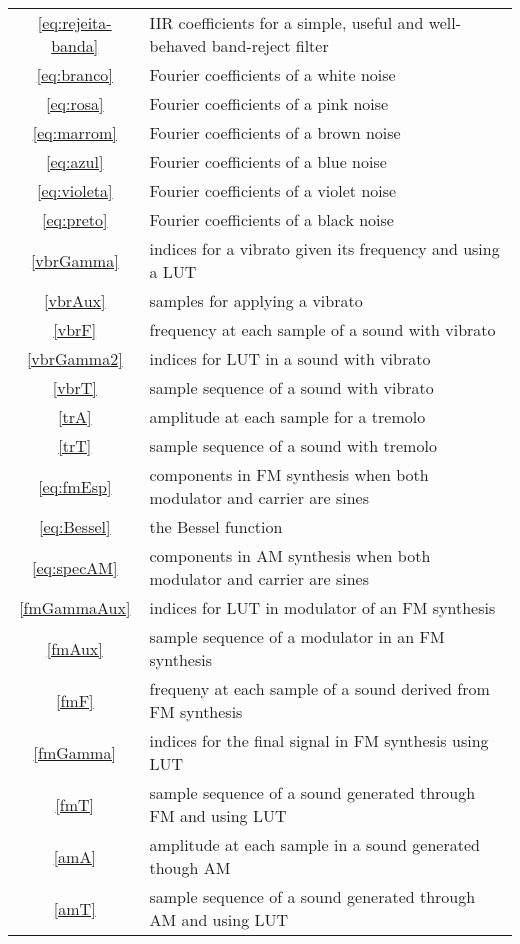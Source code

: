 \documentclass{scrreprt}
\begin{document}
\begin{table*}[htp!]
\begin{tabular}{ c | p{12cm} }
 \ref{eq:rejeita-banda} & IIR coefficients for a simple, useful and well-behaved band-reject filter \\
 \ref{eq:branco} & Fourier coefficients of a white noise \\
 \ref{eq:rosa} & Fourier coefficients of a pink noise \\
 \ref{eq:marrom} & Fourier coefficients of a brown noise \\
 \ref{eq:azul} & Fourier coefficients of a blue noise \\
 \ref{eq:violeta} & Fourier coefficients of a violet noise \\
 \ref{eq:preto} & Fourier coefficients of a black noise \\
 \ref{vbrGamma} & indices for a vibrato given its frequency and using a LUT \\
 \ref{vbrAux} & samples for applying a vibrato \\
 \ref{vbrF} & frequency at each sample of a sound with vibrato \\
 \ref{vbrGamma2} & indices for LUT in a sound with vibrato \\
 \ref{vbrT} & sample sequence of a sound with vibrato \\
 \ref{trA} & amplitude at each sample for a tremolo \\
 \ref{trT} & sample sequence of a sound with tremolo \\
 \ref{eq:fmEsp} & components in FM synthesis when both modulator and carrier are sines \\
 \ref{eq:Bessel} & the Bessel function \\
 \ref{eq:specAM} & components in AM synthesis when both modulator and carrier are sines \\
 \ref{fmGammaAux} & indices for LUT in modulator of an FM synthesis \\
 \ref{fmAux} & sample sequence of a modulator in an FM synthesis \\
 \ref{fmF} & frequeny at each sample of a sound derived from FM synthesis \\
 \ref{fmGamma} & indices for the final signal in FM synthesis using LUT \\
 \ref{fmT} & sample sequence of a sound generated through FM and using LUT \\
 \ref{amA} & amplitude at each sample in a sound generated though AM \\
 \ref{amT} & sample sequence of a sound generated through AM and using LUT \\
\end{tabular}
\end{table*}
\end{document}
